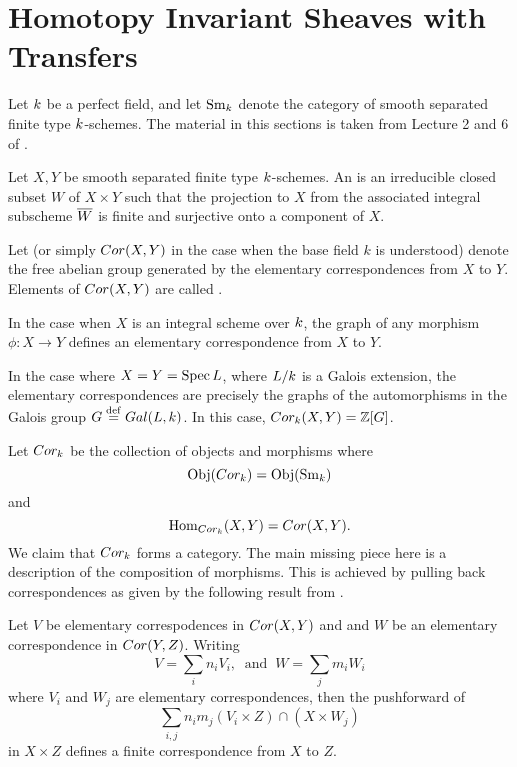 \newpage
\section{Homotopy Invariant Sheaves with Transfers}\label{sect_hist}

Let $k$ be a perfect field, and let $\mathrm{Sm}_{k}$ denote the 
category of smooth separated finite type $k$-schemes. The 
material in this sections is taken from Lecture 2 and 6 of 
\cite{MVW}.

\begin{defn}\label{def_cor}
Let $X, Y$ be smooth separated finite type $k$-schemes. 
An  is an 
irreducible closed subset $W$ of $X \times Y$ such that the 
projection to $X$ from the associated integral subscheme $\overline{W}$ 
is finite and surjective onto a component of $X$.

Let  (or simply $Cor(X, Y)$ in the 
case when the base field $k$ is understood) denote the free 
abelian group generated by the elementary correspondences from 
$X$ to $Y$. Elements of $Cor(X, Y)$ are called .
\end{defn}

\begin{ex}
In the case when $X$ is an integral scheme over $k$, the 
graph of any morphism $\phi: X \to Y$ defines an elementary 
correspondence from $X$ to $Y$. 

In the case where $X = Y = \mathrm{Spec}\, L$, where $L/k$ is a 
Galois extension, the elementary correspondences are precisely the 
graphs of the automorphisms in the Galois group $G \stackrel{\mathrm{def}}{=} Gal(L, 
k)$. In this case, $Cor_{k}(X, Y) = \mathbb{Z}[G]$.
\end{ex}

Let $Cor_{k}$ be the collection of objects and morphisms 
where 
\[
\mathrm{Obj}(Cor_k) = \mathrm{Obj}(\mathrm{Sm}_{k})
\]
and
\[
\mathrm{Hom}_{Cor_k}(X, Y) = Cor(X, Y).
\]
We claim that $Cor_{k}$ forms a category. The main 
missing piece here is a description of the composition of 
morphisms. This is achieved by pulling back correspondences as 
given by the following result from \cite[1.7]{MVW}.

\begin{lem}\label{lem_cor_composition}
Let $V$ be elementary correspodences in $Cor(X, Y)$
and and $W$ be an elementary correspondence in $Cor(Y, Z)$. 
Writing
\[
V = \sum_i n_i V_i, \;\;\textrm{and}\;\; W = \sum_j m_i W_i
\]
where $V_i$ and $W_j$ are elementary correspondences, then
the pushforward of
\[
\sum_{i, j} n_im_j (V_i \times Z) \cap (X \times W_j)
\]
in $X \times Z$ defines a finite correspondence from $X$ to $Z$.
\end{lem}

